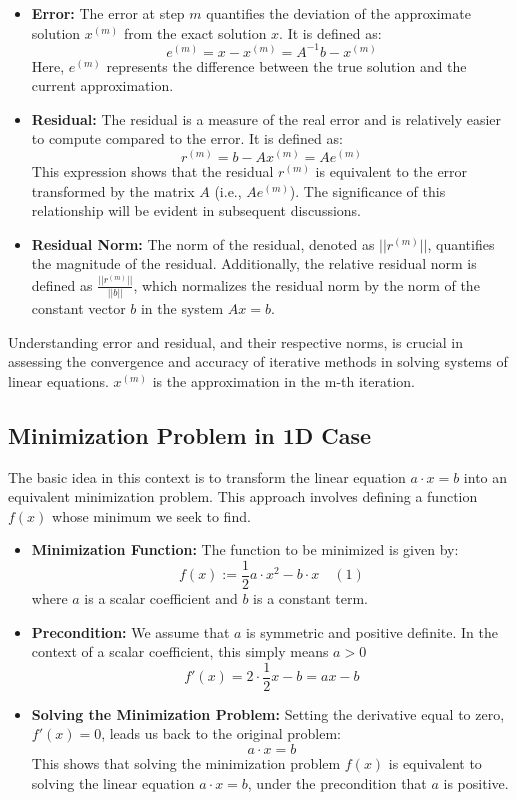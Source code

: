 \documentclass[unicode,11pt,a4paper,oneside,numbers=endperiod,openany]{scrartcl}
\begin{document}
\begin{itemize}
    \item \textbf{Error:} The error at step \( m \) quantifies the deviation of the approximate solution \( x^(m) \) from the exact solution \( x \). It is defined as:
    \[
    e^(m) = x - x^(m) = A^{-1}b - x^(m)
    \]
    Here, \( e^(m )\) represents the difference between the true solution and the current approximation.

    \item \textbf{Residual:} The residual is a measure of the real error and is relatively easier to compute compared to the error. It is defined as:
    \[
    r^(m) = b - Ax^(m) = Ae^(m)
    \]
    This expression shows that the residual \( r^(m) \) is equivalent to the error transformed by the matrix \( A \) (i.e., \( Ae^(m) \)). The significance of this relationship will be evident in subsequent discussions.

    \item \textbf{Residual Norm:} The norm of the residual, denoted as \( ||r^(m)|| \), quantifies the magnitude of the residual. Additionally, the relative residual norm is defined as \( \frac{||r^(m)||}{||b||} \), which normalizes the residual norm by the norm of the constant vector \( b \) in the system \( Ax = b \).
\end{itemize}

Understanding error and residual, and their respective norms, is crucial in assessing the convergence and accuracy of iterative methods in solving systems of linear equations.
\newline
$x^(m)$ is the approximation in the m-th iteration.

\subsection{Minimization Problem in 1D Case}

The basic idea in this context is to transform the linear equation \( a \cdot x = b \) into an equivalent minimization problem. This approach involves defining a function \( f(x) \) whose minimum we seek to find.

\begin{itemize}
    \item \textbf{Minimization Function:} The function to be minimized is given by:
    \[
    f(x) := \frac{1}{2}a \cdot x^2 - b \cdot x \quad (1)
    \]
    where \( a \) is a scalar coefficient and \( b \) is a constant term.

    \item \textbf{Precondition:} We assume that \( a \) is symmetric and positive definite. In the context of a scalar coefficient, this simply means \( a > 0 \)
    \[
    f'(x) = 2 \cdot \frac{1}{2} x-b = ax-b
    \]

    \item \textbf{Solving the Minimization Problem:} Setting the derivative equal to zero, \( f'(x) = 0 \), leads us back to the original problem:
    \[
    a \cdot x = b
    \]
    This shows that solving the minimization problem \( f(x) \) is equivalent to solving the linear equation \( a \cdot x = b \), under the precondition that \( a \) is positive.
\end{itemize}
\end{document}
